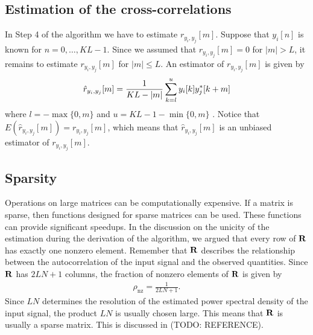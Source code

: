 \documentclass[a4paper, openany, oneside]{memoir}
\begin{document}
\subsection{Estimation of the cross-correlations}
\label{sub:reconstruction-estimation}
In Step 4 of the algorithm we have to estimate $r_{y_i,y_j}[m]$. Suppose that $y_i[n]$ is known for $n = 0,\ldots,KL-1$. Since we assumed that $r_{y_i,y_j}[m]=0$ for $|m|>L$, it remains to estimate $r_{y_i,y_j}[m]$ for $|m| \le L$. An estimator of $r_{y_i,y_j}[m]$ is given by
\begin{align} \label{eq:ryij-est}
    \hat{r}_{y_i,y_j}[m] = \frac{1}{KL-|m|}\sum_{k=l}^{u}y_i[k]y^*_j[k+m]
\end{align}
where $l=-\max\{0,m\}$ and $u=KL-1-\min\{0,m\}$ \cite{hayes1996statistical}. Notice that $E(\hat{r}_{y_i,y_j}[m])=r_{y_i,y_j}[m]$, which means that $\hat{r}_{y_i,y_j}[m]$ is an unbiased estimator of $r_{y_i,y_j}[m]$.

\subsection{Sparsity}
\label{sub:reconstruction-sparsity}
Operations on large matrices can be computationally expensive. If a matrix is sparse, then functions designed for sparse matrices can be used. These functions can provide significant speedups. In the discussion on the unicity of the estimation during the derivation of the algorithm, we argued that every row of $\boldsymbol{\mathbf{R}}$ has exactly one nonzero element. Remember that $\boldsymbol{\mathbf{R}}$ describes the relationship between the autocorrelation of the input signal and the observed quantities. Since $\boldsymbol{\mathbf{R}}$ has $2LN+1$ columns, the fraction of nonzero elements of $\boldsymbol{\mathbf{R}}$ is given by
\begin{align*}
    \rho_{\text{nz}}=\frac{1}{2LN+1}.
\end{align*}
Since $LN$ determines the resolution of the estimated power spectral density of the input signal, the product $LN$ is usually chosen large. This means that $\boldsymbol{\mathbf{R}}$ is usually a sparse matrix. This is discussed in (TODO: REFERENCE).
\end{document}
